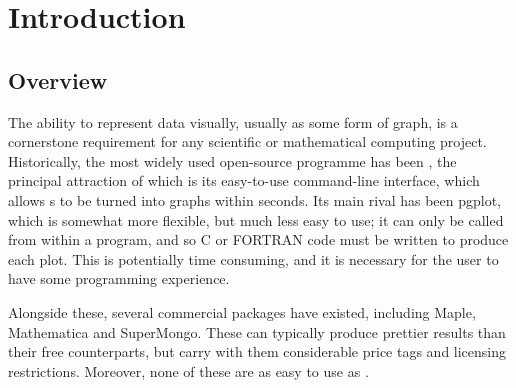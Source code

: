 %
%
%
%
%



\chapter{Introduction}

\label{introduction}

\section{Overview}

The ability to represent data visually, usually as some form of graph, is a
cornerstone requirement for any scientific or mathematical computing project.
Historically, the most widely used open-source programme has been {\sc
\gnuplot}, the principal attraction of which is its easy-to-use
command-line interface, which allows \datafile s to be turned into graphs within
seconds. Its main rival has been {\sc pgplot}, which is somewhat
more flexible, but much less easy to use; it can only be called from within a
program, and so C or FORTRAN code must be written to produce each plot. This is
potentially time consuming, and it is necessary for the user to have some
programming experience.

Alongside these, several commercial packages have existed, including {\sc
Maple}, {\sc Mathematica} and {\sc
SuperMongo}.  These can typically produce prettier results
than their free counterparts, but carry with them considerable price tags and
licensing restrictions. Moreover, none of these are as easy to use as \gnuplot.


